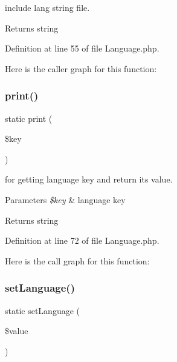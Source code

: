 include lang string file.

\begin{DoxyReturn}{Returns}
string 
\end{DoxyReturn}


Definition at line 55 of file Language.\+php.

Here is the caller graph for this function\+:
\mbox{\label{class_zest_1_1_language_1_1_language_aa22b5167814cd0d76f9c98d06da7cc2e}} 
\subsubsection{\texorpdfstring{print()}{print()}}
{\footnotesize\ttfamily static print (\begin{DoxyParamCaption}\item[{}]{\$key }\end{DoxyParamCaption})\hspace{0.3cm}{\ttfamily [static]}}

for getting language key and return its value.


\begin{DoxyParams}{Parameters}
{\em \$key} & language key\\
\hline
\end{DoxyParams}
\begin{DoxyReturn}{Returns}
string 
\end{DoxyReturn}


Definition at line 72 of file Language.\+php.

Here is the call graph for this function\+:
\mbox{\label{class_zest_1_1_language_1_1_language_ac8a46cd0f5e5c850c5ea9b79d481de1f}} 
\subsubsection{\texorpdfstring{set\+Language()}{setLanguage()}}
{\footnotesize\ttfamily static set\+Language (\begin{DoxyParamCaption}\item[{}]{\$value }\end{DoxyParamCaption})\hspace{0.3cm}{\ttfamily [static]}}

